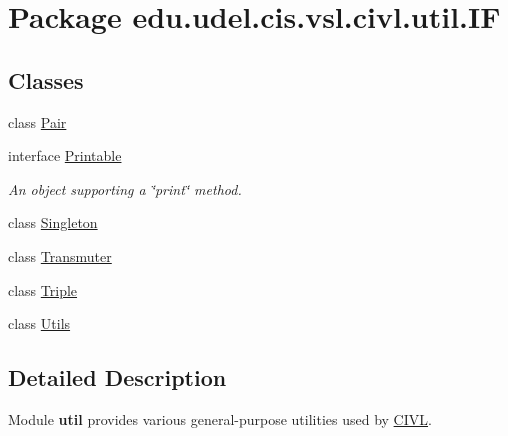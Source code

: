 \hypertarget{namespaceedu_1_1udel_1_1cis_1_1vsl_1_1civl_1_1util_1_1IF}{}\section{Package edu.\+udel.\+cis.\+vsl.\+civl.\+util.\+I\+F}
\label{namespaceedu_1_1udel_1_1cis_1_1vsl_1_1civl_1_1util_1_1IF}
\subsection*{Classes}
\begin{DoxyCompactItemize}
\item 
class \hyperlink{classedu_1_1udel_1_1cis_1_1vsl_1_1civl_1_1util_1_1IF_1_1Pair}{Pair}
\item 
interface \hyperlink{interfaceedu_1_1udel_1_1cis_1_1vsl_1_1civl_1_1util_1_1IF_1_1Printable}{Printable}
\begin{DoxyCompactList}\small\item\em An object supporting a \char`\"{}print\char`\"{} method. \end{DoxyCompactList}\item 
class \hyperlink{classedu_1_1udel_1_1cis_1_1vsl_1_1civl_1_1util_1_1IF_1_1Singleton}{Singleton}
\item 
class \hyperlink{classedu_1_1udel_1_1cis_1_1vsl_1_1civl_1_1util_1_1IF_1_1Transmuter}{Transmuter}
\item 
class \hyperlink{classedu_1_1udel_1_1cis_1_1vsl_1_1civl_1_1util_1_1IF_1_1Triple}{Triple}
\item 
class \hyperlink{classedu_1_1udel_1_1cis_1_1vsl_1_1civl_1_1util_1_1IF_1_1Utils}{Utils}
\end{DoxyCompactItemize}


\subsection{Detailed Description}
Module {\bfseries util} provides various general-\/purpose utilities used by \hyperlink{classedu_1_1udel_1_1cis_1_1vsl_1_1civl_1_1CIVL}{C\+I\+V\+L}.